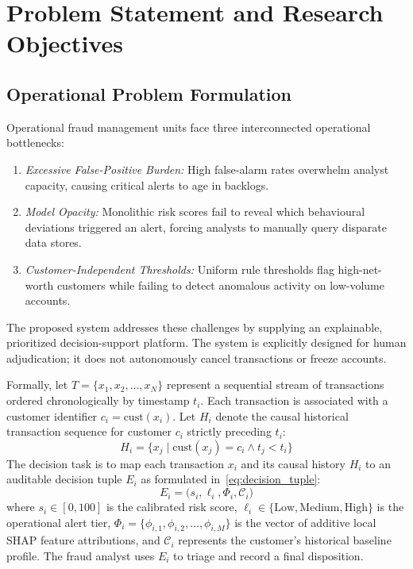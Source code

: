 \documentclass[conference]{IEEEtran}
\begin{document}
\section{Problem Statement and Research Objectives}

\subsection{Operational Problem Formulation}
Operational fraud management units face three interconnected operational bottlenecks:
\begin{enumerate}
    \item \textit{Excessive False-Positive Burden:} High false-alarm rates overwhelm analyst capacity, causing critical alerts to age in backlogs.
    \item \textit{Model Opacity:} Monolithic risk scores fail to reveal which behavioural deviations triggered an alert, forcing analysts to manually query disparate data stores.
    \item \textit{Customer-Independent Thresholds:} Uniform rule thresholds flag high-net-worth customers while failing to detect anomalous activity on low-volume accounts.
\end{enumerate}

The proposed system addresses these challenges by supplying an explainable, prioritized decision-support platform. The system is explicitly designed for human adjudication; it does not autonomously cancel transactions or freeze accounts.

Formally, let $T = \{x_1, x_2, \dots, x_N\}$ represent a sequential stream of transactions ordered chronologically by timestamp $t_i$. Each transaction is associated with a customer identifier $c_i = \text{cust}(x_i)$. Let $H_i$ denote the causal historical transaction sequence for customer $c_i$ strictly preceding $t_i$:
\begin{equation}
H_i = \{x_j \mid \text{cust}(x_j) = c_i \land t_j < t_i\}
\label{eq:causal_history}
\end{equation}
The decision task is to map each transaction $x_i$ and its causal history $H_i$ to an auditable decision tuple $E_i$ as formulated in~\eqref{eq:decision_tuple}:
\begin{equation}
E_i = \big( s_i, \ell_i, \Phi_i, \mathcal{C}_i \big)
\label{eq:decision_tuple}
\end{equation}
where $s_i \in [0, 100]$ is the calibrated risk score, $\ell_i \in \{\text{Low}, \text{Medium}, \text{High}\}$ is the operational alert tier, $\Phi_i = \{\phi_{i,1}, \phi_{i,2}, \dots, \phi_{i,M}\}$ is the vector of additive local SHAP feature attributions, and $\mathcal{C}_i$ represents the customer's historical baseline profile. The fraud analyst uses $E_i$ to triage and record a final disposition.
\end{document}
